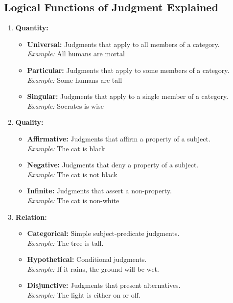 \documentclass[a4paper]{article}
\begin{document}
\subsection{Logical Functions of Judgment Explained}
\begin{enumerate}
    \item \textbf{Quantity:}
    \begin{itemize}
        \item \textbf{Universal:} Judgments that apply to all members of a category. \\
        \textit{Example:} All humans are mortal
        \item \textbf{Particular:} Judgments that apply to some members of a category. \\
        \textit{Example:} Some humans are tall
        \item \textbf{Singular:} Judgments that apply to a single member of a category. \\
        \textit{Example:} Socrates is wise
    \end{itemize}
    \item \textbf{Quality:}
    \begin{itemize}
        \item \textbf{Affirmative:} Judgments that affirm a property of a subject. \\
        \textit{Example:} The cat is black
        \item \textbf{Negative:} Judgments that deny a property of a subject. \\
        \textit{Example:} The cat is not black
        \item \textbf{Infinite:} Judgments that assert a non-property. \\
        \textit{Example:} The cat is non-white
    \end{itemize}
    \item \textbf{Relation:}
    \begin{itemize}
        \item \textbf{Categorical:} Simple subject-predicate judgments. \\
        \textit{Example:} The tree is tall.
        \item \textbf{Hypothetical:} Conditional judgments. \\
        \textit{Example:} If it rains, the ground will be wet.
        \item \textbf{Disjunctive:} Judgments that present alternatives. \\
        \textit{Example:} The light is either on or off.

\end{itemize}
\end{enumerate}
\end{document}
